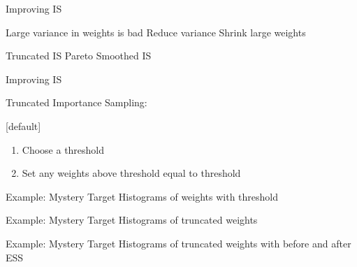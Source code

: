 \documentclass[14pt]{beamer}
\begin{document}


\begin{frame}{Improving IS}
    \begin{outline}
        \1 Large variance in weights is bad
            \2 Reduce variance
            \2 Shrink large weights \newline
        
        \1 Truncated IS
        \1 Pareto Smoothed IS
    \end{outline}
\end{frame}

\begin{frame}{Improving IS}
    \begin{outline}
        \1 Truncated Importance Sampling:
            \2 \citep{Ion08} \newline
    \end{outline}

    [default]
    \begin{enumerate}
        \item Choose a threshold
        \item Set any weights above threshold equal to threshold
    \end{enumerate}
\end{frame}

\begin{frame}{Example: Mystery Target}
    Histograms of weights with threshold
\end{frame}

\begin{frame}{Example: Mystery Target}
    Histograms of truncated weights
\end{frame}

\begin{frame}{Example: Mystery Target}
    Histograms of truncated weights with before and after ESS
\end{frame}
\end{document}
